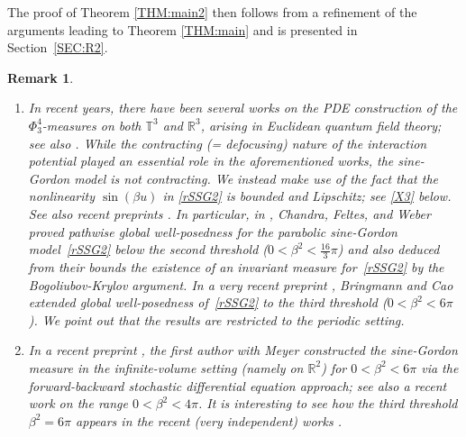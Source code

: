 \documentclass[letterpaper, 11pt,  reqno]{amsart}
\theoremstyle{myremark}
\newtheorem{remark}[theorem]{Remark}
\newcommand{\1}{\hspace{0.5mm}\text{I}\hspace{0.5mm}}
\newcommand{\R}{\mathbb{R}}
\newcommand{\T}{\mathbb{T}}
\newcommand{\be}{\beta}
\numberwithin{equation}{section}
\numberwithin{theorem}{section}
\begin{document}
The proof of Theorem \ref{THM:main2} then follows from a refinement of the arguments leading to Theorem \ref{THM:main} and is presented in Section~\ref{SEC:R2}.


\begin{remark}
\begin{enumerate}
\item 
In recent years, there have been several works \cite{AK, GH2, AK2}
on the PDE construction of the $\Phi^4_3$-measures
on both $\T^3$ and $\R^3$, 
arising in Euclidean quantum field theory;
see also \cite{MW, OTWZ}.
While the contracting (= defocusing)  nature
of the interaction potential played an essential role in the aforementioned works, 
the sine-Gordon model is {\it not} contracting.
We instead make use of the fact that 
the nonlinearity $\sin(\be u)$ in 
 \eqref{rSSG2}  is bounded and Lipschitz;
see \eqref{X3} below.
See also recent preprints \cite{CFW, SZZ, BC}.
In particular, 
 in \cite[Corollary 3]{CFW}, Chandra, Feltes,  and Weber proved pathwise 
 global well-posedness for the parabolic sine-Gordon model~\eqref{rSSG2} 
below  the second threshold ($0 < \be^2 < \frac{16}{3}\pi$)
 and also deduced from their bounds the existence of an invariant measure for~\eqref{rSSG2} 
 by  the Bogoliubov-Krylov argument. 
In a very recent preprint \cite{BC}, 
Bringmann and Cao extended 
global well-posedness 
of~\eqref{rSSG2} 
to the third threshold  ($0 < \be^2 < 6 \pi$).
We point out that the results
\cite{CFW, SZZ, BC}
are restricted to the periodic setting.

\item In a recent preprint \cite{GM}, 
the first author with Meyer
constructed the sine-Gordon measure  in the infinite-volume setting 
(namely on $\R^2$) 
for $0 < \be^2 < 6\pi$
via 
the forward-backward stochastic differential equation approach;
see also a recent work \cite{Bara} on the range $0 < \be^2 < 4\pi$.
It is interesting to see how the third threshold
$\be^2 = 6\pi$ appears
in the recent (very independent)  works \cite{BB, GM, BC}.


\end{enumerate}
\end{remark}
\end{document}
